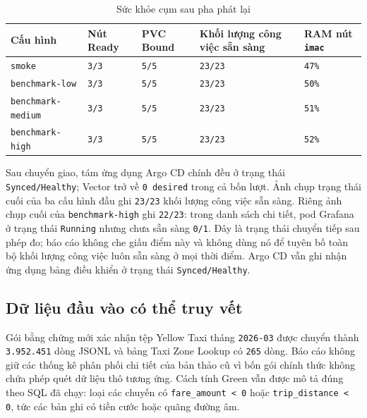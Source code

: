 \begin{table}[H]
\centering
\caption{Sức khỏe cụm sau pha phát lại}
\label{tab:health-after-replay-vi}
\begin{tabularx}{\textwidth}{@{}p{}p{}p{}p{}Y@{}}
\toprule
\textbf{Cấu hình} & \textbf{Nút Ready} & \textbf{PVC Bound} & \textbf{Khối lượng công việc sẵn sàng} & \textbf{RAM nút \texttt{imac}}\\
\midrule
\texttt{smoke} & \texttt{3/3} & \texttt{5/5} & \texttt{23/23} & \texttt{47\%}\\
\texttt{benchmark-low} & \texttt{3/3} & \texttt{5/5} & \texttt{23/23} & \texttt{50\%}\\
\texttt{benchmark-medium} & \texttt{3/3} & \texttt{5/5} & \texttt{23/23} & \texttt{51\%}\\
\texttt{benchmark-high} & \texttt{3/3} & \texttt{5/5} & \texttt{23/23} & \texttt{52\%}\\
\bottomrule
\end{tabularx}
\end{table}

Sau chuyển giao, tám ứng dụng Argo CD chính đều ở trạng thái \texttt{Synced/Healthy}; Vector trở về \texttt{0 desired} trong cả bốn lượt. Ảnh chụp trạng thái cuối của ba cấu hình đầu ghi \texttt{23/23} khối lượng công việc sẵn sàng. Riêng ảnh chụp cuối của \texttt{benchmark-high} ghi \texttt{22/23}: trong danh sách chi tiết, pod Grafana ở trạng thái \texttt{Running} nhưng chưa sẵn sàng \texttt{0/1}. Đây là trạng thái chuyển tiếp sau phép đo; báo cáo không che giấu điểm này và không dùng nó để tuyên bố toàn bộ khối lượng công việc luôn sẵn sàng ở mọi thời điểm. Argo CD vẫn ghi nhận ứng dụng bảng điều khiển ở trạng thái \texttt{Synced/Healthy}.

\subsection{Dữ liệu đầu vào có thể truy vết}
Gói bằng chứng mới xác nhận tệp Yellow Taxi tháng \texttt{2026-03} được chuyển thành \texttt{3.952.451} dòng JSONL và bảng Taxi Zone Lookup có \texttt{265} dòng. Báo cáo không giữ các thống kê phân phối chi tiết của bản thảo cũ vì bốn gói chính thức không chứa phép quét dữ liệu thô tương ứng. Cách tính Green vẫn được mô tả đúng theo SQL đã chạy: loại các chuyến có \texttt{fare\_amount < 0} hoặc \texttt{trip\_distance < 0}, tức các bản ghi có tiền cước hoặc quãng đường âm.

